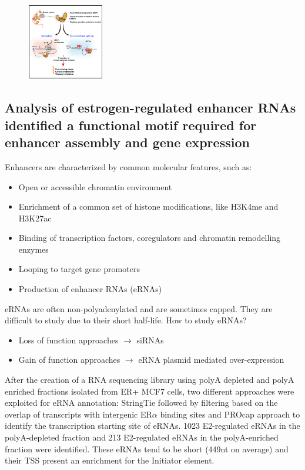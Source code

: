 \begin{figure}
\centering
\includegraphics[width=0.3\textwidth]{../_resources/era.png}
\caption{}
\end{figure}

\subsection{Analysis of estrogen-regulated enhancer RNAs identified a functional motif required for enhancer assembly and gene expression}
Enhancers are characterized by common molecular features, such as: 
\begin{itemize}
\tightlist
\item Open or accessible chromatin environment 
\item Enrichment of a common set of histone modifications, like H3K4me and H3K27ac 
\item Binding of transcription factors, coregulators and chromatin remodelling enzymes 
\item Looping to target gene promoters  
\item Production of enhancer RNAs (eRNAs)
\end{itemize}

eRNAs are often non-polyadenylated and are sometimes capped.  They are difficult to study due to their short half-life. 
How to study eRNAs? 
\begin{itemize}
\tightlist
\item Loss of function approaches $\rightarrow$ siRNAs 
\item Gain of function approaches  $\rightarrow$  eRNA plasmid mediated over-expression
\end{itemize}

After the creation of a RNA sequencing library using polyA depleted and polyA enriched fractions
isolated from ER+ MCF7 cells, two different approaches were exploited for eRNA annotation: StringTie followed by filtering based on the overlap of transcripts with intergenic ER$\alpha$ binding sites and PROcap approach to identify the transcription starting site of eRNAs.
1023 E2-regulated eRNAs in the polyA-depleted fraction and 213 E2-regulated
eRNAs in the polyA-enriched fraction were identified.
These eRNAs tend to be short (449nt on average) and their TSS present an enrichment for the Initiator element.

